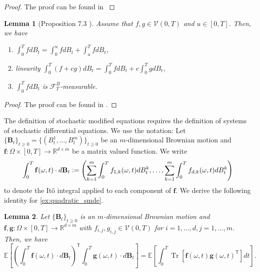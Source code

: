 \documentclass[12pt]{article}
\newtheorem{lemma}[lemma]{Lemma}
\theoremstyle{definition}
\numberwithin{equation}{section}
\newcommand{\R}{\mathbb{R}}
\newcommand{\CF}{\mathcal{F}}
\newcommand{\CV}{\mathcal{V}}
\newcommand{\T}{\mathsf{T}}
\newcommand{\ev}[1]{\mathbb{E}\left[{#1}\right]}
\newcommand{\defeq}{\vcentcolon=}
\DeclareMathOperator{\Tr}{Tr}
\begin{document}
\begin{proof}
  The proof can be found in \cite[pp.~208]{capassoIntroductionContinuousTimeStochastic2012}
\end{proof}
\begin{lemma}[Proposition 7.3 ]
  Assume that $f,g \in \CV(0,T)$ and $u \in [0,T]$. Then, we have
  \begin{enumerate}[label=(\roman*)]
    \item $\displaystyle\int_0^TfdB_t = \int_0^ufdB_t + \int_u^TfdB_t$,
    \item linearity $\displaystyle\int_0^T(f+cg)dB_t =  \int_0^TfdB_t + c \int_0^TgdB_t$,
    \item $\displaystyle\int_0^TfdB_t$ is $\CF_T^B$-measurable.
  \end{enumerate}
\end{lemma}
\begin{proof}
  The proof can be found in \cite{eAppliedStochasticAnalysis2021}.
\end{proof}
The definition of stochastic modified equations requires the definition of systems of stochastic differential equations. We use the notation: Let $\{\mathbf{B}_t\}_{t\geq 0} = \{(B^1_t, \dots, B^m_t)\}_{t\geq 0}$ be an $m$-dimensional Brownian motion and $\mathbf{f}: \Omega \times [0,T] \rightarrow \R^{d \times m}$ be a matrix valued function. We write 
\begin{equation*}
  \int_0^T \mathbf{f}(\omega, t)\cdot d\mathbf{B}_t \defeq \left(\sum_{k=1}^m\int_0^T f_{1,k}(\omega, t)dB_t^k, \dots, \sum_{k=1}^m\int_0^T f_{d,k}(\omega, t)dB_t^k \right)
\end{equation*}
to denote the Itô integral applied to each component of $\mathbf{f}$.
We derive the following identity for \autoref{ex:quadratic_smde}.
\begin{lemma}
  \label{lem:ito}
  Let $\{\pmb{B}_t\}_{t\geq0}$ is an $m$-dimensional Brownian motion and $\mathbf{f}, \mathbf{g}: \Omega \times [0,T] \rightarrow \R^{d \times m}$ with $f_{i,j}, g_{i,j}  \in \CV(0,T)$ for $i=1,\dots,d, j=1,\dots,m$. Then, we have
  \begin{equation}
  \label{eq:multivariate_ito_isometry}
    \ev{\left(\int_0^T \pmb{f}(\omega, t)\cdot d\pmb{B}_t\right)^\mathsf{T}\int_0^T \pmb{g}(\omega, t)\cdot d\pmb{B}_t} = \ev{\int_0^T \Tr\left[\pmb{f}(\omega, t)\pmb{g}(\omega, t)^\T\right]dt}.
  \end{equation}

\end{lemma}
\end{document}
